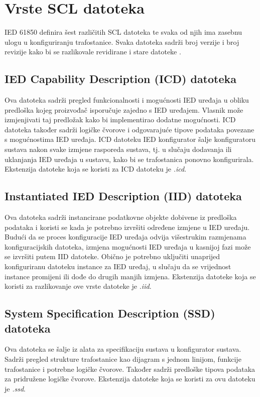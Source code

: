 \documentclass[times, utf8, zavrsni]{fer}
\begin{document}
\section{Vrste SCL datoteka}
IED 61850 definira šest različitih SCL datoteka te svaka od njih ima zasebnu ulogu u konfiguriranju trafostanice. Svaka datoteka sadrži broj verzije i broj revizije kako bi se razlikovale revidirane i stare datoteke \citep{aftab2019novel}.

\subsection{IED Capability Description (ICD) datoteka}
Ova datoteka sadrži pregled funkcionalnosti i mogućnosti IED uređaja u obliku predloška kojeg proizvođač  isporučuje zajedno s IED uređajem. Vlasnik može izmjenjivati taj predložak kako bi implementirao dodatne mogućnosti. ICD datoteka također sadrži logičke čvorove i odgovarajuće tipove podataka povezane s mogućnostima IED uređaja. ICD datoteku IED konfigurator šalje konfiguratoru sustava nakon svake izmjene rasporeda sustava, tj. u slučaju dodavanja ili uklanjanja IED uređaja u sustavu, kako bi se trafostanica ponovno konfigurirala. Ekstenzija datoteke koja se koristi za ICD datoteku je \textit{.icd}.

\subsection{Instantiated IED Description (IID) datoteka}
Ova datoteka sadrži instancirane podatkovne objekte dobivene iz predloška podataka i koristi se kada je potrebno izvršiti određene izmjene u IED uređaju. Budući da se proces konfiguracije IED uređaja odvija višestrukim razmjenama konfiguracijskih datoteka, izmjena mogućnosti IED uređaja u kasnijoj fazi može se izvršiti putem IID datoteke. Obično je potrebno uključiti unaprijed konfiguriranu datoteku instance za IED uređaj, u slučaju da se vrijednost instance promijeni ili dođe do drugih manjih izmjena. Ekstenzija datoteke koja se koristi za razlikovanje ove vrste datoteke je \textit{.iid}.

\subsection{System Specification Description (SSD) datoteka}
Ova datoteka se šalje iz alata za specifikaciju sustava u konfigurator sustava. Sadrži pregled strukture trafostanice kao dijagram s jednom linijom, funkcije trafostanice i potrebne logičke čvorove. Također sadrži predloške tipova  podataka za pridružene logičke čvorove. Ekstenzija datoteke koja se koristi za ovu datoteku je \textit{.ssd}.
\end{document}
